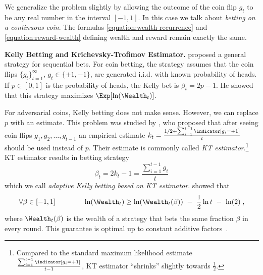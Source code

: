 We generalize the problem slightly by allowing the outcome of the coin flip
$g_t$ to be any real number in the interval $[-1,1]$. In this case we talk about
\emph{betting on a continuous coin}. The formulas
\eqref{equation:wealth-recurrence} and \eqref{equation:reward-wealth} defining
wealth and reward remain exactly the same.

\noindent\textbf{Kelly Betting and Krichevsky-Trofimov Estimator.} \citet{Kelly56} proposed a general strategy for sequential bets. For coin
betting, the strategy assumes that the coin flips $\{g_t\}_{t=1}^\infty$, $g_t
\in \{+1,-1\}$, are generated i.i.d. with known probability of heads. If $p \in
[0,1]$ is the probability of heads, the Kelly bet is
$
\beta_t = 2p - 1
$.
He showed that this strategy maximizes $\Exp[\ln(\Wealth_t)]$.

For adversarial coins, Kelly betting does not make sense. However, we can
replace $p$ with an estimate. This problem was studied by \citet{Krichevsky-Trofimov-1981},
who proposed that after seeing coin flips $g_1, g_2, \dots, g_{t-1}$ an
empirical estimate $k_t = \frac{1/2 + \sum_{i=1}^{t-1} \indicator[g_i = +1]}{t}$
should be used instead of $p$. Their estimate is commonly called \emph{KT
estimator}.\footnote{Compared to the standard maximum likelihood estimate
$\frac{\sum_{i=1}^{t-1} \indicator[g_i = +1]}{t-1}$, KT estimator ``shrinks''
slightly towards $\frac{1}{2}$.} KT estimator results in betting strategy
\begin{equation}
\label{equation:kt-estimator-betting-strategy}
\beta_t = 2k_t - 1 = \frac{\sum_{i=1}^{t-1} g_i}{t}
\end{equation}
which we call \emph{adaptive Kelly betting based on KT estimator}.
\citeauthor{Krichevsky-Trofimov-1981} showed that
$$
\forall \beta \in [-1,1] \qquad \qquad \ln(\Wealth_t) \ge \ln(\Wealth_t(\beta)) \ - \ \frac{1}{2} \ln t \ - \ \ln(2) \; ,
$$
where $\Wealth_t(\beta)$ is the wealth of a strategy that bets the same fraction
$\beta$ in every round. This guarantee is optimal up to constant additive factors~\citep{Cesa-Bianchi-Lugosi-2006}.
